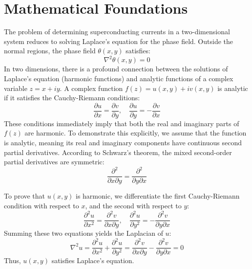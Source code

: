 \documentclass[english,binding=0.6cm,noexaminfo]{sapthesis}
\begin{document}
\section{Mathematical Foundations}
\label{mathmetods}
The problem of determining superconducting currents in a two-dimensional system reduces to solving Laplace's equation for the phase field. Outside the normal regions, the phase field $\theta(x,y)$ satisfies:
\begin{equation}
    \nabla^2 \theta(x,y) = 0
\end{equation}
In two dimensions, there is a profound connection between the solutions of Laplace's equation (harmonic functions) and analytic functions of a complex variable $z = x + iy$. A complex function $f(z) = u(x,y) + iv(x,y)$ is analytic if it satisfies the Cauchy-Riemann conditions:
\begin{equation}
    \frac{\partial u}{\partial x} = \frac{\partial v}{\partial y}, \quad \frac{\partial u}{\partial y} = -\frac{\partial v}{\partial x}
\end{equation}
These conditions immediately imply that both the real and imaginary parts of $f(z)$ are harmonic. To demonstrate this explicitly, we assume that the function is analytic, meaning its real and imaginary components have continuous second partial derivatives. According to Schwarz's theorem, the mixed second-order partial derivatives are symmetric:
\begin{equation}
    \frac{\partial^2}{\partial x \partial y} = \frac{\partial^2}{\partial y \partial x}
\end{equation}

To prove that $u(x,y)$ is harmonic, we differentiate the first Cauchy-Riemann condition with respect to $x$, and the second with respect to $y$:
\begin{equation}
    \frac{\partial^2 u}{\partial x^2} = \frac{\partial^2 v}{\partial x \partial y}, \quad \frac{\partial^2 u}{\partial y^2} = -\frac{\partial^2 v}{\partial y \partial x}
\end{equation}
Summing these two equations yields the Laplacian of $u$:
\begin{equation}
    \nabla^2 u = \frac{\partial^2 u}{\partial x^2} + \frac{\partial^2 u}{\partial y^2} = \frac{\partial^2 v}{\partial x \partial y} - \frac{\partial^2 v}{\partial y \partial x} = 0
\end{equation}
Thus, $u(x,y)$ satisfies Laplace's equation. 
\end{document}
